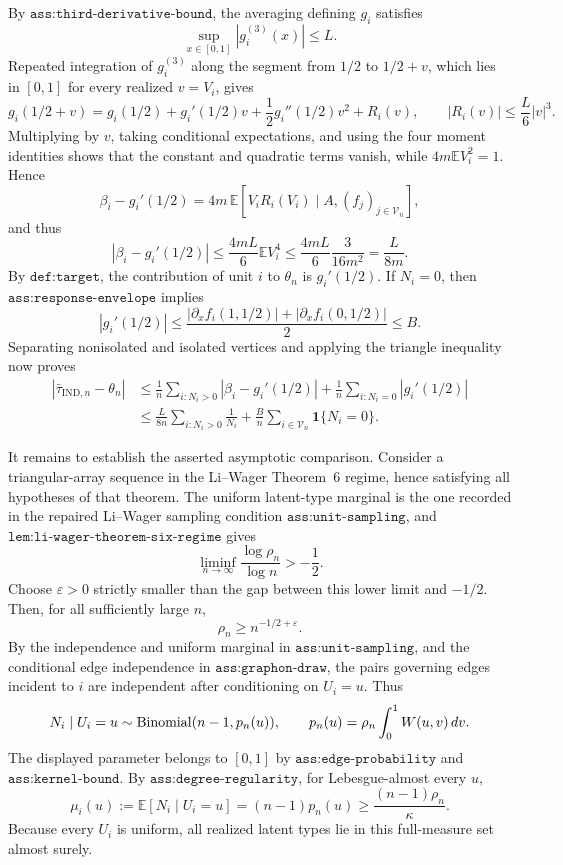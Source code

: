 By \(\texttt{ass:third-derivative-bound}\), the averaging defining \(g_i\) satisfies
\[
\sup_{x\in[0,1]}|g_i^{(3)}(x)|\le L.
\]
Repeated integration of \(g_i^{(3)}\) along the segment from \(1/2\) to \(1/2+v\), which lies in \([0,1]\) for every realized \(v=V_i\), gives
\[
g_i(1/2+v)
=g_i(1/2)+g_i'(1/2)v+\frac12g_i''(1/2)v^2+R_i(v),
\qquad
|R_i(v)|\le\frac L6|v|^3.
\]
Multiplying by \(v\), taking conditional expectations, and using the four moment identities shows that the constant and quadratic terms vanish, while \(4m\mathbb E V_i^2=1\).  Hence
\[
\beta_i-g_i'(1/2)
=4m\,\mathbb E\!\left[V_iR_i(V_i)\mid A,(f_j)_{j\in\mathcal V_n}\right],
\]
and thus
\[
|\beta_i-g_i'(1/2)|
\le \frac{4mL}{6}\mathbb E V_i^4
\le \frac{4mL}{6}\frac3{16m^2}
=\frac{L}{8m}.
\]
By \(\texttt{def:target}\), the contribution of unit \(i\) to \(\theta_n\) is \(g_i'(1/2)\).  If \(N_i=0\), then \(\texttt{ass:response-envelope}\) implies
\[
|g_i'(1/2)|
\le\frac{|\partial_x f_i(1,1/2)|+|\partial_x f_i(0,1/2)|}{2}
\le B.
\]
Separating nonisolated and isolated vertices and applying the triangle inequality now proves
\[
\begin{aligned}
|\bar\tau_{\mathrm{IND},n}-\theta_n|
&\le \frac1n\sum_{i:N_i>0}|\beta_i-g_i'(1/2)|
+\frac1n\sum_{i:N_i=0}|g_i'(1/2)|\\
&\le \frac{L}{8n}\sum_{i:N_i>0}\frac1{N_i}
+\frac Bn\sum_{i\in\mathcal V_n}\mathbf1\{N_i=0\}.
\end{aligned}
\]

It remains to establish the asserted asymptotic comparison.  Consider a triangular-array sequence in the Li--Wager Theorem~6 regime, hence satisfying all hypotheses of that theorem.  The uniform latent-type marginal is the one recorded in the repaired Li--Wager sampling condition \(\texttt{ass:unit-sampling}\), and \(\texttt{lem:li-wager-theorem-six-regime}\) gives
\[
\liminf_{n\to\infty}\frac{\log\rho_n}{\log n}>-\frac12.
\]
Choose \(\varepsilon>0\) strictly smaller than the gap between this lower limit and \(-1/2\).  Then, for all sufficiently large \(n\),
\[
\rho_n\ge n^{-1/2+\varepsilon}.
\]
By the independence and uniform marginal in \(\texttt{ass:unit-sampling}\), and the conditional edge independence in \(\texttt{ass:graphon-draw}\), the pairs governing edges incident to \(i\) are independent after conditioning on \(U_i=u\).  Thus
\[
N_i\mid U_i=u\sim {\rm Binomial}(n-1,p_n(u)),
\qquad
p_n(u)=\rho_n\int_0^1W(u,v)\,dv.
\]
The displayed parameter belongs to \([0,1]\) by \(\texttt{ass:edge-probability}\) and \(\texttt{ass:kernel-bound}\).  By \(\texttt{ass:degree-regularity}\), for Lebesgue-almost every \(u\),
\[
\mu_i(u):=\mathbb E[N_i\mid U_i=u]
=(n-1)p_n(u)
\ge\frac{(n-1)\rho_n}{\kappa}.
\]
Because every \(U_i\) is uniform, all realized latent types lie in this full-measure set almost surely.

